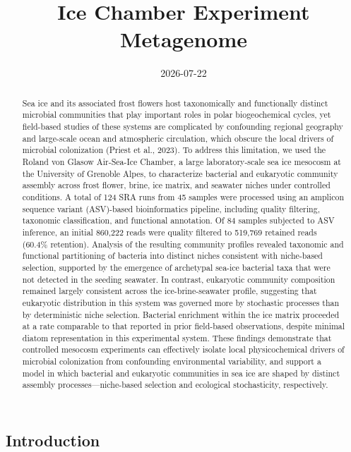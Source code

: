 \documentclass[
  11pt,
]{article}
\title{Ice Chamber Experiment Metagenome}
\author{}
\date{2026-07-22}
\begin{document}
\maketitle
\begin{abstract}
Sea ice and its associated frost flowers host taxonomically and
functionally distinct microbial communities that play important roles in
polar biogeochemical cycles, yet field-based studies of these systems
are complicated by confounding regional geography and large-scale ocean
and atmospheric circulation, which obscure the local drivers of
microbial colonization (Priest et al., 2023). To address this
limitation, we used the Roland von Glasow Air-Sea-Ice Chamber, a large
laboratory-scale sea ice mesocosm at the University of Grenoble Alpes,
to characterize bacterial and eukaryotic community assembly across frost
flower, brine, ice matrix, and seawater niches under controlled
conditions. A total of 124 SRA runs from 45 samples were processed using
an amplicon sequence variant (ASV)-based bioinformatics pipeline,
including quality filtering, taxonomic classification, and functional
annotation. Of 84 samples subjected to ASV inference, an initial 860,222
reads were quality filtered to 519,769 retained reads (60.4\%
retention). Analysis of the resulting community profiles revealed
taxonomic and functional partitioning of bacteria into distinct niches
consistent with niche-based selection, supported by the emergence of
archetypal sea-ice bacterial taxa that were not detected in the seeding
seawater. In contrast, eukaryotic community composition remained largely
consistent across the ice-brine-seawater profile, suggesting that
eukaryotic distribution in this system was governed more by stochastic
processes than by deterministic niche selection. Bacterial enrichment
within the ice matrix proceeded at a rate comparable to that reported in
prior field-based observations, despite minimal diatom representation in
this experimental system. These findings demonstrate that controlled
mesocosm experiments can effectively isolate local physicochemical
drivers of microbial colonization from confounding environmental
variability, and support a model in which bacterial and eukaryotic
communities in sea ice are shaped by distinct assembly
processes---niche-based selection and ecological stochasticity,
respectively.
\end{abstract}


\subsection{Introduction}\label{introduction}
\end{document}
